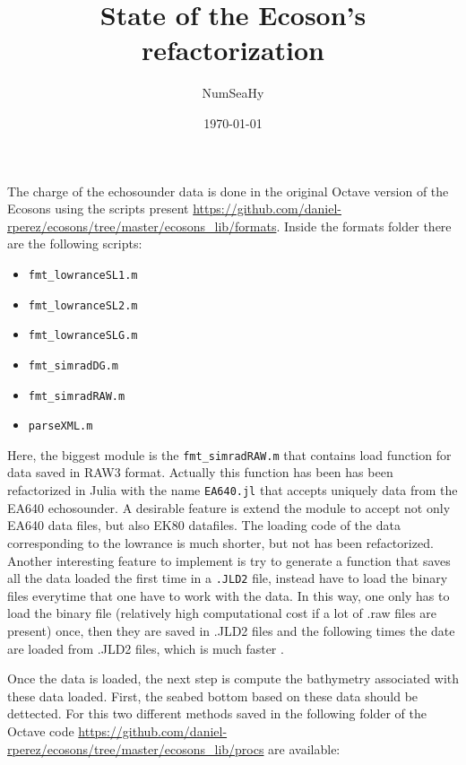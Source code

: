 \documentclass{article}[a4paper, 12pt]
\title{State of the Ecoson's refactorization}
\author{NumSeaHy}
\date{\today}
\begin{document}
\maketitle

\setcounter{section}{1}

\listoftodos

\vspace{2cm}

The charge of the echosounder data is done in the original Octave version of the Ecosons using the scripts present \url{https://github.com/daniel-rperez/ecosons/tree/master/ecosons_lib/formats}. Inside the formats folder there are the following scripts:

\begin{itemize}
    \item \texttt{fmt\_lowranceSL1.m}
    \item \texttt{fmt\_lowranceSL2.m}
    \item \texttt{fmt\_lowranceSLG.m}
    \item \texttt{fmt\_simradDG.m}
    \item \texttt{fmt\_simradRAW.m}
    \item \texttt{parseXML.m}
\end{itemize}

Here, the biggest module is the \texttt{fmt\_simradRAW.m} that contains load function for data saved in RAW3 format. Actually this function  has been has been refactorized in Julia with the name \texttt{EA640.jl} that accepts uniquely data from the EA640 echosounder. A desirable feature is extend the module to accept not only EA640 data files, but also  EK80 datafiles. The loading code of the data corresponding to the lowrance is much shorter, but not has been refactorized. 
Another interesting feature to implement is try to generate a function that saves all the data loaded the first time in a \texttt{.JLD2} file, instead have to load the binary files everytime that one have to work with the data. In this way, one only has to load the binary file (relatively high computational cost if a lot of .raw files are present) once, then they are saved in .JLD2 files and the following times the date are loaded from .JLD2 files, which is much faster  .

\vspace{1cm}

Once the data is loaded, the next step is compute the bathymetry associated with these data loaded. First, the seabed bottom based on these data should be dettected. For this two different methods saved in the following folder of the Octave code \url{https://github.com/daniel-rperez/ecosons/tree/master/ecosons_lib/procs} are available:
\end{document}

